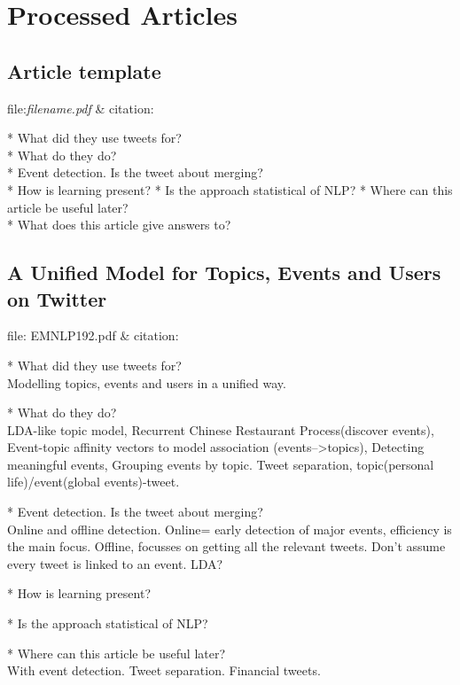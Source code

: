 \chapter{Processed Articles}

\section{Article template}
file:\textit{filename.pdf} & citation:\cite[]{}  

* What did they use tweets for?\\
* What do they do?\\
* Event detection. Is the tweet about merging? \\
* How is learning present?
* Is the approach statistical of NLP? 
* Where can this article be useful later? \\
* What does this article give answers to?\\


\section{A Unified Model for Topics, Events and Users on Twitter}
file: EMNLP192.pdf &
citation:\cite[]{diao-jiang:2013:EMNLP}

* What did they use tweets for?\\
Modelling topics, events and users in a unified way. 

* What do they do?\\
LDA-like topic model, 
Recurrent Chinese Restaurant Process(discover events), 
Event-topic affinity vectors to model association (events-->topics),
Detecting meaningful events, 
Grouping events by topic. 
Tweet separation, topic(personal life)/event(global events)-tweet.


* Event detection. Is the tweet about merging? \\
Online and offline detection. Online= early detection of major events,
efficiency is the main focus. 
Offline, focusses on getting all the relevant tweets. 
Don't assume every tweet is linked to an event. 
LDA?

* How is learning present?

* Is the approach statistical of NLP?

* Where can this article be useful later? \\
With event detection. Tweet separation. Financial tweets.  

